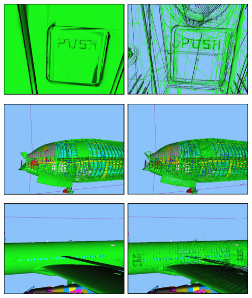 \begin{Bild}
\includegraphics[scale=0.40]{images/button.pdf}
\end{Bild}
\vspace{0.9cm}
\begin{Bild}
\includegraphics[scale=0.40]{images/profil_bug.pdf}
\end{Bild}
\vspace{0.9cm}
\begin{Bild}
\includegraphics[scale=0.40]{images/profil_heck.pdf}
\end{Bild}

